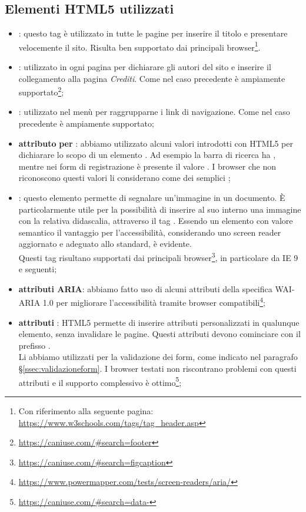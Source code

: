 \documentclass[12pt]{article}
\begin{document}
	\subsection{Elementi HTML5 utilizzati}
	\begin{itemize}
		\item {}: questo tag è utilizzato in tutte le pagine per inserire il titolo e presentare velocemente il sito. Risulta ben supportato dai principali browser\footnote{Con riferimento alla seguente pagina: \url{https://www.w3schools.com/tags/tag_header.asp}}.
		\item {}: utilizzato in ogni pagina per dichiarare gli autori del sito e inserire il collegamento alla pagina \textit{Crediti}. Come nel caso precedente è ampiamente supportato\footnote{\url{https://caniuse.com/\#search=footer}};
		\item {}: utilizzato nel menù per raggrupparne i link di navigazione. Come nel caso precedente è ampiamente supportato;
		\item \textbf{attributo}  \textbf{per} : abbiamo utilizzato alcuni valori introdotti con HTML5 per dichiarare lo scopo di un elemento . Ad esempio la barra di ricerca ha , mentre nei form di registrazione è presente il valore . I browser che non riconoscono questi valori li considerano come dei semplici ;
		\item {}: questo elemento permette di segnalare un'immagine in un documento. È particolarmente utile per la possibilità di inserire al suo interno una immagine con la relativa didascalia, attraverso il tag . Essendo un elemento con valore semantico il vantaggio per l'accessibilità, considerando uno screen reader aggiornato e adeguato allo standard, è evidente.\\ Questi tag risultano supportati dai principali browser\footnote{\url{https://caniuse.com/\#search=figcaption}}, in particolare da IE 9 e seguenti;
		\item \textbf{attributi ARIA}: abbiamo fatto uso di alcuni attributi della specifica WAI-ARIA 1.0 per migliorare l'accessibilità tramite browser compatibili\footnote{\url{https://www.powermapper.com/tests/screen-readers/aria/}};
		\item \textbf{attributi} : HTML5 permette di inserire attributi personalizzati in qualunque elemento, senza invalidare le pagine. Questi attributi devono cominciare con il prefisso .\\Li abbiamo utilizzati per la validazione dei form, come indicato nel paragrafo §\ref{ssec:validazioneform}. I browser testati non riscontrano problemi con questi attributi e il supporto complessivo è ottimo\footnote{\url{https://caniuse.com/\#search=data-}};

\end{itemize}
\end{document}

